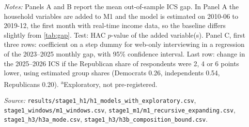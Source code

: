 \begin{table}[htbp]
\begin{threeparttable}
\begin{tabular}{@{}l c c c l@{}}
\bottomrule
\end{tabular}
\begin{tablenotes}[flushleft]\footnotesize
\item \textit{Notes:} Panels A and B report the mean out-of-sample ICS gap. In Panel A the household variables are added to M1 and the model is estimated on 2010-06 to 2019-12, the first month with real-time income data, so the baseline differs slightly from \cref{tab:gap}. Test: HAC $p$-value of the added variable(s). Panel C, first three rows: coefficient on a step dummy for web-only interviewing in a regression of the 2023--2025 monthly gap, with 95\% confidence interval. Last row: change in the 2025--2026 ICS if the Republican share of respondents were 2, 4 or 6 points lower, using estimated group shares (Democrats 0.26, independents 0.54, Republicans 0.20). \textsuperscript{a}Exploratory, not pre-registered.
\item \textit{Source:} \texttt{results/stage1\_h1/h1\_models\_with\_exploratory.csv}, \texttt{stage1\_windows/m1\_windows.csv}, \texttt{stage1\_m1/m1\_recursive\_expanding.csv}, \texttt{stage1\_h3/h3a\_mode.csv}, \texttt{stage1\_h3/h3b\_composition\_bound.csv}.
\end{tablenotes}
\end{threeparttable}
\end{table}
